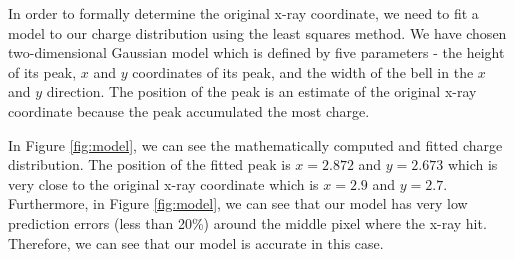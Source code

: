 \documentclass{article}
\begin{document}
In order to formally determine the original x-ray coordinate, we need to fit a model to our charge distribution using the least squares method. We have chosen two-dimensional Gaussian model which is defined by five parameters - the height of its peak, $x$ and $y$ coordinates of its peak, and the width of the bell in the $x$ and $y$ direction. The position of the peak is an estimate of the original x-ray coordinate because the peak accumulated the most charge.

In Figure \ref{fig:model}, we can see the mathematically computed and fitted charge distribution. The position of the fitted peak is $x=2.872$ and $y=2.673$ which is very close to the original x-ray coordinate which is $x=2.9$ and $y=2.7$. Furthermore, in Figure \ref{fig:model}, we can see that our model has very low prediction errors (less than 20\%) around the middle pixel where the x-ray hit. Therefore, we can see that our model is accurate in this case.
\end{document}
